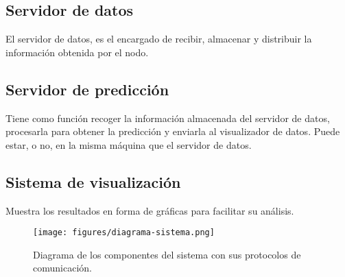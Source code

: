 \subsection{Servidor de datos}
\label{makereference1.2.2}
El servidor de datos, es el encargado de recibir, almacenar y distribuir la información obtenida por el nodo.

\subsection{Servidor de predicción}
\label{makereference1.2.3}
Tiene como función recoger la información almacenada del servidor de datos, procesarla para obtener la predicción y enviarla al visualizador de datos. Puede estar, o no, en la misma máquina que el servidor de datos.

\subsection{Sistema de visualización}
\label{makereference1.2.4}
Muestra los resultados en forma de gráficas para facilitar su análisis.

\begin{figure}[htb]
    \begin{center}
        \texttt{[image: figures/diagrama-sistema.png]}
        \caption{Diagrama de los componentes del sistema con sus protocolos de comunicación. \label{diagrama-sistema}}
    \end{center}
\end{figure}
